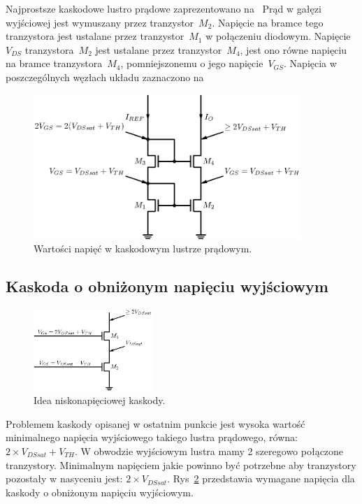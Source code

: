 \documentclass[twoside,pl,final]{labman}
\begin{document}
Najprostsze kaskodowe lustro prądowe zaprezentowano na~
Prąd w gałęzi wyjściowej jest wymuszany przez tranzystor~$M_2$.
Napięcie na bramce tego tranzystora jest ustalane
przez tranzystor~$M_1$ w połączeniu diodowym.
Napięcie~$V_{DS}$ tranzystora~$M_2$ jest ustalane przez tranzystor~$M_4$,
jest ono równe napięciu na bramce tranzystora~$M_4$,
pomniejszonemu o jego napięcie~$V_{GS}$.
Napięcia w poszczególnych węzłach układu
zaznaczono na~

\begin{figure}[!htbp]
  \centering
  \includegraphics[width=0.9\textwidth]{cascode_simple_node}
  \caption{Wartości napięć w kaskodowym lustrze prądowym.}
  \label{fig:cascode:simple:node}
\end{figure}

\subsection{Kaskoda o obniżonym napięciu wyjściowym}
\label{cascode:wideswing}

\begin{figure}[!htbp]
  \centering
  \includegraphics[width=0.4\textwidth]{cascode_wideswing}
  \caption{Idea niskonapięciowej kaskody.}
  \label{fig:cascode:wideswing:idea}
\end{figure}

Problemem kaskody opisanej w ostatnim punkcie jest wysoka wartość minimalnego
napięcia wyjściowego takiego lustra prądowego,
równa: $2 \times V_{DSsat} + V_{TH}$.
W obwodzie wyjściowym lustra mamy 2 szeregowo połączone tranzystory.
Minimalnym napięciem jakie powinno być potrzebne
aby tranzystory pozostały w nasyceniu jest: $2 \times V_{DSsat}$.
Rys~\ref{fig:cascode:wideswing:idea} przedstawia
wymagane napięcia dla kaskody o obniżonym napięciu wyjściowym.
\end{document}
